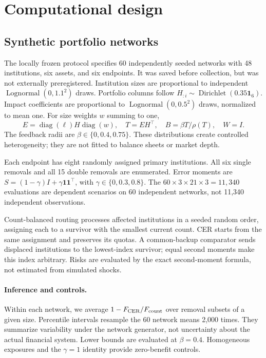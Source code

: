 \documentclass[11pt]{article}
\newcommand{\one}{\mathbf{1}}
\newcommand{\diag}{\operatorname{diag}}
\begin{document}
\section{Computational design}
\subsection{Synthetic portfolio networks}
The locally frozen protocol specifies 60 independently seeded networks with 48 institutions, six assets, and six endpoints. It was saved before collection, but was not externally preregistered. Institution sizes are proportional to independent \(\operatorname{Lognormal}(0,1.1^2)\) draws. Portfolio columns follow
\(H_{:i}\sim\operatorname{Dirichlet}(0.35\one_6)\).
Impact coefficients are proportional to \(\operatorname{Lognormal}(0,0.5^2)\) draws, normalized to mean one. For size weights \(w\) summing to one,
\begin{equation}
 E=\diag(\ell)H\diag(w),\quad
 T=EH^\top,\quad B=\beta T/\rho(T),\quad W=I.
 \label{eq:network}
\end{equation}
The feedback radii are \(\beta\in\{0,0.4,0.75\}\). These distributions create controlled heterogeneity; they are not fitted to balance sheets or market depth.

Each endpoint has eight randomly assigned primary institutions. All six single removals and all 15 double removals are enumerated. Error moments are \(S=(1-\gamma)I+\gamma\one\one^\top\), with \(\gamma\in\{0,0.3,0.8\}\).
The \(60\times3\times21\times3=11{,}340\) evaluations are dependent scenarios on 60 independent networks, not 11,340 independent observations.

Count-balanced routing processes affected institutions in a seeded random order, assigning each to a survivor with the smallest current count. CER starts from the same assignment and preserves its quotas. A common-backup comparator sends displaced institutions to the lowest-index survivor; equal second moments make this index arbitrary. Risks are evaluated by the exact second-moment formula, not estimated from simulated shocks.

\paragraph{Inference and controls.}
Within each network, we average \(1-F_{\rm CER}/F_{\rm count}\) over removal subsets of a given size. Percentile intervals resample the 60 network means 2,000 times. They summarize variability under the network generator, not uncertainty about the actual financial system. Lower bounds are evaluated at \(\beta=0.4\). Homogeneous exposures and the \(\gamma=1\) identity provide zero-benefit controls.
\end{document}
